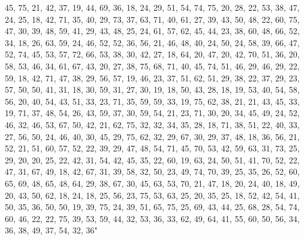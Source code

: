 \documentclass[
]{article}
\begin{document}
\begin{Schunk}
\begin{Soutput}
45, 75, 21, 42, 37, 19, 44, 69, 36, 18, 24, 29, 51, 54, 74, 75, 20, 28, 22, 53, 38, 47, 24, 25, 18, 42, 71, 35, 40, 29, 73, 37, 63, 71, 40, 61, 27, 39, 43, 50, 48, 22, 60, 75, 47, 30, 39, 48, 59, 41, 29, 43, 48, 25, 24, 61, 57, 62, 45, 44, 23, 38, 60, 48, 66, 52, 34, 18, 26, 63, 59, 24, 46, 52, 52, 36, 56, 21, 46, 48, 40, 24, 50, 24, 58, 39, 66, 47, 52, 74, 45, 53, 57, 72, 66, 53, 38, 30, 42, 27, 18, 64, 20, 47, 20, 42, 70, 51, 36, 20, 58, 53, 46, 34, 61, 67, 43, 20, 27, 38, 75, 68, 71, 40, 45, 74, 51, 46, 29, 46, 29, 22, 59, 18, 42, 71, 47, 38, 29, 56, 57, 19, 46, 23, 37, 51, 62, 51, 29, 38, 22, 37, 29, 23, 57, 50, 50, 41, 31, 18, 30, 59, 31, 27, 30, 19, 18, 50, 43, 28, 18, 19, 53, 40, 54, 58, 56, 20, 40, 54, 43, 51, 33, 23, 71, 35, 59, 59, 33, 19, 75, 62, 38, 21, 21, 43, 45, 33, 19, 71, 37, 48, 54, 26, 43, 59, 37, 30, 59, 54, 21, 23, 71, 30, 20, 34, 45, 49, 24, 52, 46, 32, 46, 53, 67, 50, 42, 21, 62, 75, 32, 32, 34, 35, 28, 18, 71, 38, 51, 22, 40, 33, 27, 56, 50, 24, 46, 40, 30, 45, 29, 75, 62, 32, 29, 67, 30, 29, 37, 48, 18, 36, 56, 21, 52, 21, 51, 60, 57, 52, 22, 39, 29, 47, 48, 54, 71, 45, 70, 53, 42, 59, 63, 31, 73, 25, 29, 20, 20, 25, 22, 42, 31, 54, 42, 45, 35, 22, 60, 19, 63, 24, 50, 51, 41, 70, 52, 22, 47, 31, 67, 49, 18, 42, 67, 31, 39, 58, 32, 50, 23, 49, 74, 70, 39, 25, 35, 26, 52, 60, 65, 69, 48, 65, 48, 64, 29, 38, 67, 30, 45, 63, 53, 70, 21, 47, 18, 20, 24, 40, 18, 49, 20, 43, 50, 62, 18, 24, 18, 25, 56, 23, 75, 53, 63, 25, 20, 35, 25, 18, 52, 42, 54, 41, 50, 35, 36, 50, 50, 19, 39, 75, 24, 39, 51, 65, 75, 25, 69, 43, 44, 25, 68, 28, 54, 74, 60, 46, 22, 22, 75, 39, 53, 59, 44, 32, 53, 36, 33, 62, 49, 64, 41, 55, 60, 50, 56, 34, 36, 38, 49, 37, 54, 32, 36" 

\end{Soutput}
\end{Schunk}
\end{document}
